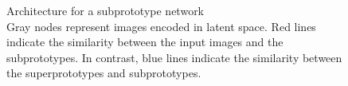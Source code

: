 \begin{figure}[hb]
    \centering
    
    \caption{Architecture for a subprototype network\\ {\normalfont Gray nodes represent images encoded in latent space. {\color{red} Red} lines indicate the similarity between the input images and the subprototypes. In contrast, {\color{blue} blue} lines indicate the similarity between the superprototypes and subprototypes.}}
    \label{fig:hierarchical}
\end{figure}
